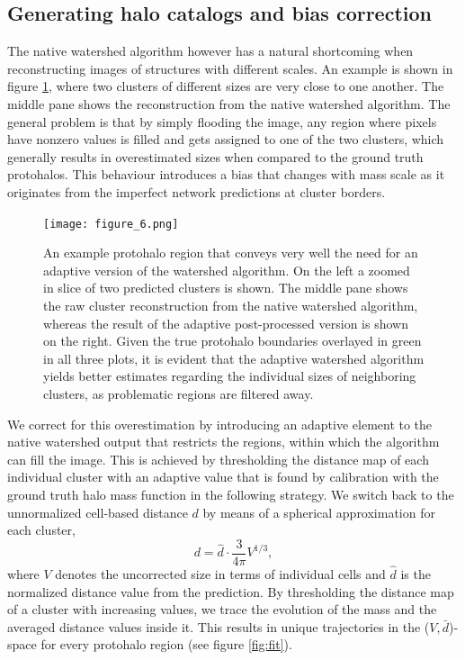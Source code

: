 \documentclass[fleqn,usenatbib]{mnras}
\begin{document}
\subsection{Generating halo catalogs and bias correction}
The native watershed algorithm however has a natural shortcoming when reconstructing images of structures with different scales. An example is shown in figure \ref{fig:adaptive_example}, where two clusters of different sizes are very close to one another. The middle pane shows the reconstruction from the native watershed algorithm. The general problem is that by simply flooding the image, any region where pixels have nonzero values is filled and gets assigned to one of the two clusters, which generally results in overestimated sizes when compared to the ground truth protohalos. This behaviour introduces a bias that changes with mass scale as it originates from the imperfect network predictions at cluster borders.\par
\begin{figure}
 \texttt{[image: figure\_6.png]}
 \caption{An example protohalo region that conveys very well the need for an adaptive version of the watershed algorithm. On the left a zoomed in slice of two predicted clusters is shown. The middle pane shows the raw cluster reconstruction from the native watershed algorithm, whereas the result of the adaptive post-processed version is shown on the right. Given the true protohalo boundaries overlayed in green in all three plots, it is evident that the adaptive watershed algorithm yields better estimates regarding the individual sizes of neighboring clusters, as problematic regions are filtered away.}
 \label{fig:adaptive_example}
\end{figure}
We correct for this overestimation by introducing an adaptive element to the native watershed output that restricts the regions, within which the algorithm can fill the image. This is achieved by thresholding the distance map of each individual cluster with an adaptive value that is found by calibration with the ground truth halo mass function in the following strategy. We switch back to the unnormalized cell-based distance $d$ by means of a spherical approximation for each cluster,
\begin{equation}
    d = \hat{d}\cdot\frac{3}{4\pi}V^{1/3},
\end{equation}
where $V$ denotes the uncorrected size in terms of individual cells and $\hat{d}$ is the normalized distance value from the prediction. By thresholding the distance map of a cluster with increasing values, we trace the evolution of the mass and the averaged distance values inside it. This results in unique trajectories in the ($V,\bar{d}$)-space for every protohalo region (see figure \ref{fig:fit}). 
\end{document}
